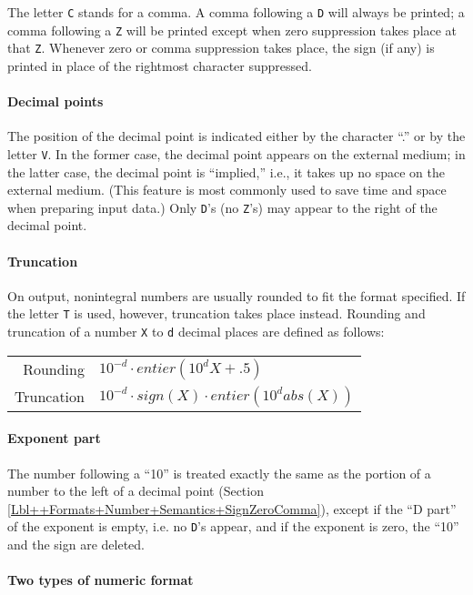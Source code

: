 \documentclass[a4paper,11pt]{article}
\begin{document}
The letter {\tt C} stands for a comma.  A comma following a {\tt D}
will always be printed; a comma following a {\tt Z} will be printed
except when zero suppression takes place at that {\tt Z}. Whenever
zero or comma suppression takes place, the sign (if any) is printed in
place of the rightmost character suppressed.

\paragraph{Decimal points}

The position of the decimal point is indicated either by the character
``.'' or by the letter {\tt V}. In the former case, the decimal point
appears on the external medium; in the latter case, the decimal point
is ``implied,'' i.e., it takes up no space on the external
medium. (This feature is most commonly used to save time and space
when preparing input data.) Only {\tt D}'s (no {\tt Z}'s) may appear
to the right of the decimal point.

\paragraph{Truncation}

On output, nonintegral numbers are usually rounded to fit the format
specified.  If the letter {\tt T} is used, however, truncation takes
place instead.  Rounding and truncation of a number {\tt X} to {\tt d}
decimal places are defined as follows:

\begin{tabular*}{15.0cm}{rp{10.0cm}}
Rounding   & $10^{-d}\cdot entier(10^d X + .5)$\\
Truncation & $10^{-d}\cdot sign(X)\cdot entier(10^d abs(X))$\\
\end{tabular*}

\paragraph{Exponent part}

The number following a ``10'' is treated exactly the same as the
portion of a number to the left of a decimal point (Section
\ref{Lbl++Formats+Number+Semantics+SignZeroComma}), except if the ``D
part'' of the exponent is empty, i.e. no {\tt D}'s appear, and if the
exponent is zero, the ``10'' and the sign are deleted.

\paragraph{Two types of numeric format}
\end{document}
